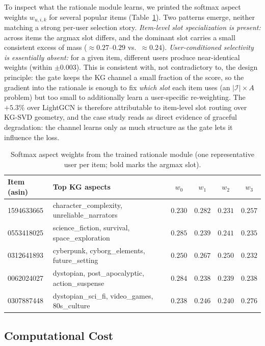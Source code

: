 \documentclass[12pt,a4paper]{article}
\begin{document}
To inspect what the rationale module learns, we printed the softmax aspect weights $w_{u,i,k}$ for several popular items (Table~\ref{tab:case}). Two patterns emerge, neither matching a strong per-user selection story. \emph{Item-level slot specialization is present:} across items the argmax slot differs, and the dominant slot carries a small consistent excess of mass ($\approx 0.27$--$0.29$ vs.\ $\approx 0.24$). \emph{User-conditioned selectivity is essentially absent:} for a given item, different users produce near-identical weights (within $\pm0.003$). This is consistent with, not contradictory to, the design principle: the gate keeps the KG channel a small fraction of the score, so the gradient into the rationale is enough to fix \emph{which slot} each item uses (an $|\mathcal{I}|\times A$ problem) but too small to additionally learn a user-specific re-weighting. The $+5.3\%$ over LightGCN is therefore attributable to item-level slot routing over KG-SVD geometry, and the case study reads as direct evidence of graceful degradation: the channel learns only as much structure as the gate lets it influence the loss.

\begin{table}[!ht]
\centering
\caption{Softmax aspect weights from the trained rationale module (one representative user per item; bold marks the argmax slot).}
\label{tab:case}
\small
\begin{tabular}{llcccc}
\toprule
Item (asin) & Top KG aspects & $w_0$ & $w_1$ & $w_2$ & $w_3$ \\
\midrule
1594633665 & character\_complexity, unreliable\_narrators & $0.230$ & $\mathbf{0.282}$ & $0.231$ & $0.257$ \\
0553418025 & science\_fiction, survival, space\_exploration & $\mathbf{0.285}$ & $0.239$ & $0.241$ & $0.235$ \\
0312641893 & cyberpunk, cyborg\_elements, future\_setting & $0.250$ & $\mathbf{0.267}$ & $0.250$ & $0.232$ \\
0062024027 & dystopian, post\_apocalyptic, action\_suspense & $\mathbf{0.284}$ & $0.238$ & $0.239$ & $0.238$ \\
0307887448 & dystopian\_sci\_fi, video\_games, 80s\_culture & $0.238$ & $0.246$ & $0.240$ & $\mathbf{0.276}$ \\
\bottomrule
\end{tabular}
\end{table}

\subsection{Computational Cost}
\end{document}
